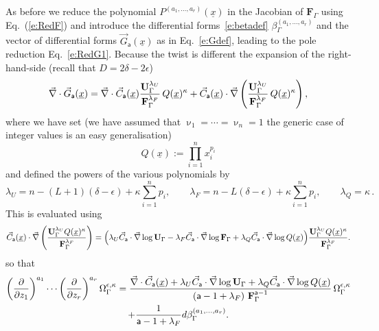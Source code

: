 \documentclass[a4paper,12pt]{article}
\numberwithin{equation}{section}
\numberwithin{figure}{section}
\begin{document}
As before we reduce the  polynomial
$P^{(a_1,\dots,a_r)}(\underline x)$ in the Jacobian of
$\textbf{F}_\Gamma$ using Eq.~(\ref{e:RedF}) and introduce the
differential forms~\eqref{e:betadef}
$\beta_\Gamma^{(a_1,\dots,a_r)}$  and the vector of differential forms $\vec
G_{\mathsf{a}}(\underline x)$ as in Eq.~\eqref{e:Gdef}, leading to the
pole reduction Eq.~\eqref{e:RedG1}.
Because the twist is different the expansion of the 
right-hand-side  (recall that $D=2\delta-2\epsilon$)
\begin{equation}
  \vec\nabla \cdot \vec G_{\mathsf{a}}(\underline x)=  \vec\nabla \cdot \vec C_{\mathsf{a}}(\underline x) { \textbf{U}_\Gamma ^{\lambda_U}  \over \textbf{F}_\Gamma ^{\lambda_F} }\,
  Q(\underline x)^\kappa
+
  \vec C_{\mathsf{a}}(\underline x) \cdot\vec\nabla  \left({ \textbf{U}_\Gamma ^{\lambda_U}  \over \textbf{F}_\Gamma ^{\lambda_F} }\,
  Q(\underline x)^\kappa \right) ,
\end{equation}
where we have set (we have assumed that $\upnu_1=\cdots=\upnu_n=1$ the
generic case of integer values is an easy generalisation)
\begin{equation}
  Q(\underline x):=\prod_{i=1}^n x_i^{p_i}   
\end{equation}
and defined the powers of the various polynomials by
\begin{equation}
  \label{e:powerUFQDef}
  \lambda_U= n-(L+1)(\delta-\epsilon)+\kappa\sum_{i=1}^n p_i, \qquad
  \lambda_F= n-L(\delta-\epsilon)+\kappa\sum_{i=1}^n p_i, \qquad
  \lambda_Q  = \kappa\,.
\end{equation}
%
This is  evaluated using 
\begin{equation}
  \vec C_{\mathsf{a}}(\underline x)\cdot \vec\nabla
  \left(\mathbf{U}_\Gamma^{\lambda_U}Q(\underline x)^\kappa\over
\mathbf{F}_\Gamma^{\lambda_F}\right)=\Big(\lambda_U \vec
C_{\mathsf{a}}\cdot \vec\nabla \log\mathbf{U}_\Gamma -\lambda_F \vec
C_{\mathsf{a}}\cdot \vec\nabla \log \mathbf{F}_\Gamma+\lambda_Q \vec
C_{\mathsf{a}}\cdot\vec\nabla \log Q(\underline                             x)\Big)
                            {\mathbf{U}_\Gamma^{\lambda_U}Q(\underline x)^\kappa\over
\mathbf{F}_\Gamma^{\lambda_F}} .
\end{equation}
so that
\begin{multline}
	\label{e:PredAnReg}
\left(\partial\over \partial z_1\right)^{a_1}\cdots\left(\partial
  \over\partial z_r\right)^{a_r} \Omega_\Gamma^{\epsilon,\kappa}={
\vec\nabla \cdot \vec C_{\mathsf{a}}
     (\underline x)
+  \lambda_U \vec
    C_{\mathsf{a}}\cdot\vec\nabla\log\mathbf{U}_\Gamma+\lambda_Q \vec
    C_{\mathsf{a}}\cdot\vec\nabla\log Q(\underline x)\over
    \left(\mathsf{a}-1+\lambda_F\right)\,\textbf{F}_\Gamma^{\mathsf{a}-1}}\,
  \Omega_\Gamma^{\epsilon,\kappa}\cr
+{  1 \over \mathsf{a}-1+\lambda_F} d\beta_\Gamma^{(a_1,\dots,a_r)}.
\end{multline}
\end{document}
